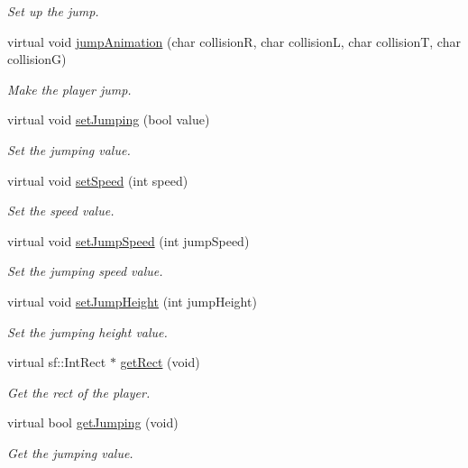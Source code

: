 \begin{DoxyCompactItemize}
\begin{DoxyCompactList}\small\item\em Set up the jump. \end{DoxyCompactList}\item 
virtual void \hyperlink{class_player_af0cbf262b74bd173c708e32a1df22c4b}{jump\-Animation} (char collision\-R, char collision\-L, char collision\-T, char collision\-G)
\begin{DoxyCompactList}\small\item\em Make the player jump. \end{DoxyCompactList}\item 
virtual void \hyperlink{class_player_ae71f2d49d8ae2482210981745e699318}{set\-Jumping} (bool value)
\begin{DoxyCompactList}\small\item\em Set the jumping value. \end{DoxyCompactList}\item 
virtual void \hyperlink{class_player_afe708570bc166a91649478dd22108e7a}{set\-Speed} (int speed)
\begin{DoxyCompactList}\small\item\em Set the speed value. \end{DoxyCompactList}\item 
virtual void \hyperlink{class_player_ada5c4c79a954c38fb5d329666d78a379}{set\-Jump\-Speed} (int jump\-Speed)
\begin{DoxyCompactList}\small\item\em Set the jumping speed value. \end{DoxyCompactList}\item 
virtual void \hyperlink{class_player_ad5a29d64aae25aaa440283866b74509b}{set\-Jump\-Height} (int jump\-Height)
\begin{DoxyCompactList}\small\item\em Set the jumping height value. \end{DoxyCompactList}\item 
virtual sf\-::\-Int\-Rect $\ast$ \hyperlink{class_player_a1967129b1085527e58d605bc657f80ff}{get\-Rect} (void)
\begin{DoxyCompactList}\small\item\em Get the rect of the player. \end{DoxyCompactList}\item 
virtual bool \hyperlink{class_player_a803903a8eae317b46d3ecd22babb231f}{get\-Jumping} (void)
\begin{DoxyCompactList}\small\item\em Get the jumping value. \end{DoxyCompactList}\item 

\end{DoxyCompactItemize}
